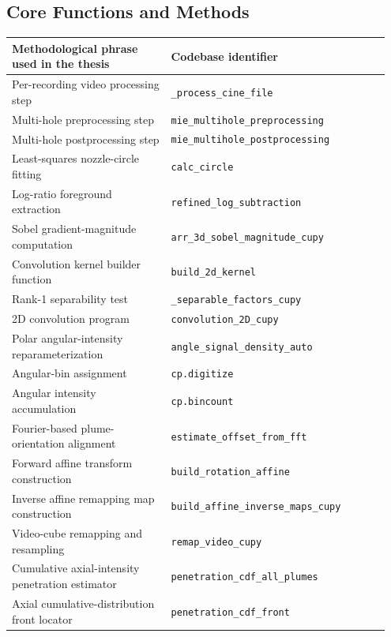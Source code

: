\FloatBarrier
\clearpage

\subsection{Core Functions and Methods}

\begin{table}[!ht]
\centering
\footnotesize
\begin{tabular}{p{0.4\linewidth} p{0.55\linewidth}}
\toprule
\textbf{Methodological phrase used in the thesis} & \textbf{Codebase identifier} \\
\midrule
Per-recording video processing step & \texttt{\_process\_cine\_file} \\
Multi-hole preprocessing step & \texttt{mie\_multihole\_preprocessing} \\
Multi-hole postprocessing step & \texttt{mie\_multihole\_postprocessing} \\
Least-squares nozzle-circle fitting & \texttt{calc\_circle} \\
Log-ratio foreground extraction & \texttt{refined\_log\_subtraction} \\
Sobel gradient-magnitude computation & \texttt{arr\_3d\_sobel\_magnitude\_cupy} \\
Convolution kernel builder function & \texttt{build\_2d\_kernel} \\
Rank-1 separability test & \texttt{\_separable\_factors\_cupy} \\
2D convolution program & \texttt{convolution\_2D\_cupy} \\
Polar angular-intensity reparameterization & \texttt{angle\_signal\_density\_auto} \\
Angular-bin assignment & \texttt{cp.digitize} \\
Angular intensity accumulation & \texttt{cp.bincount} \\
Fourier-based plume-orientation alignment & \texttt{estimate\_offset\_from\_fft} \\
Forward affine transform construction & \texttt{build\_rotation\_affine} \\
Inverse affine remapping map construction & \texttt{build\_affine\_inverse\_maps\_cupy} \\
Video-cube remapping and resampling & \texttt{remap\_video\_cupy} \\
Cumulative axial-intensity penetration estimator & \texttt{penetration\_cdf\_all\_plumes} \\
Axial cumulative-distribution front locator & \texttt{penetration\_cdf\_front} \\

\end{tabular}
\end{table}
